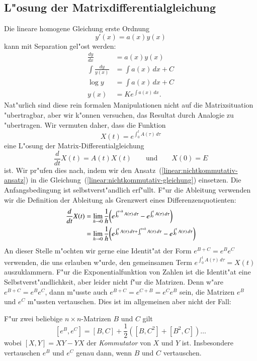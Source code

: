 \subsection{L"osung der Matrixdifferentialgleichung}
Die lineare homogene Gleichung erste Ordnung
\[
y'(x)=a(x)y(x)
\]
kann mit Separation gel"ost werden:
\begin{align*}
\frac{dy}{dx}&=a(x)y(x)
\\
\int\frac{dy}{y(x)}&=\int a(x)\,dx+C
\\
\log y &= \int a(x)\,dx + C
\\
y(x)&=Ke^{\int a(x)\,dx}.
\end{align*}
Nat"urlich sind diese rein formalen Manipulationen nicht auf die
Matrixsituation "ubertragbar, aber wir k"onnen versuchen, das Resultat
durch Analogie zu "ubertragen.
Wir vermuten daher, dass die Funktion
\begin{equation}
X(t)=e^{\int_0^tA(\tau)\,d\tau}
\label{linear:nichtkommutativ-ansatz}
\end{equation}
eine L"osung der Matrix-Differentialgleichung
\begin{equation}
\frac{d}{dt}X(t)=A(t)X(t)\qquad\text{und}\qquad X(0)=E
\label{linear:nichtkommutativ-gleichung}
\end{equation}
ist.
Wir pr"ufen dies nach, indem wir den
Ansatz~(\ref{linear:nichtkommutativ-ansatz})
in die Gleichung~(\ref{linear:nichtkommutativ-gleichung}) einsetzen.
Die Anfangsbedingung ist selbstverst"andlich erf"ullt.
F"ur die Ableitung verwenden wir die Definition der Ableitung als
Grenzwert eines Differenzenquotienten:
\begin{align}
\frac{d}{dt}X(t)
&=
\lim_{h\to 0}\frac1h\biggl(e^{\int_0^{t+h}A(\tau)\,d\tau}
-
e^{\int_0^tA(\tau)\,d\tau}\biggr)
\notag
\\
&=
\lim_{h\to 0}\frac1h\biggl(
e^{\int_0^tA(\tau)\,d\tau
+
\int_t^{t+h}A(\tau)\,d\tau}
-
e^{\int_0^tA(\tau)\,d\tau}\biggr)
\label{linear:nichtkommutativ-diffquot}
\end{align}
An dieser Stelle m"ochten wir gerne eine Identit"at der Form $e^{B+C}=e^Be^C$
verwenden, die uns erlauben w"urde, den gemeinsamen Term
$e^{\int_0^tA(\tau)\,d\tau}=X(t)$ auszuklammern.
F"ur die Exponentialfunktion von Zahlen ist die Identit"at eine
Selbstverst"andlichkeit, aber leider nicht f"ur die Matrizen.
Denn w"are $e^{B+C}=e^Be^C$, dann m"usste auch $e^{B+C}=e^{C+B}=e^Ce^B$
sein, die Matrizen $e^B$ und $e^C$ m"ussten vertauschen.
Dies ist im allgemeinen aber nicht der Fall:

\begin{satz}
F"ur zwei beliebige $n\times n$-Matrizen $B$ und $C$ gilt
\[
[e^B,e^C]=[B,C]+\frac12([B,C^2]+[B^2,C])\dots
\]
wobei $[X,Y]=XY-YX$ der {\em Kommutator} von $X$ und $Y$ ist.
Insbesondere vertauschen $e^B$ und $e^C$ genau dann, wenn $B$ und $C$
vertauschen.
\end{satz}

